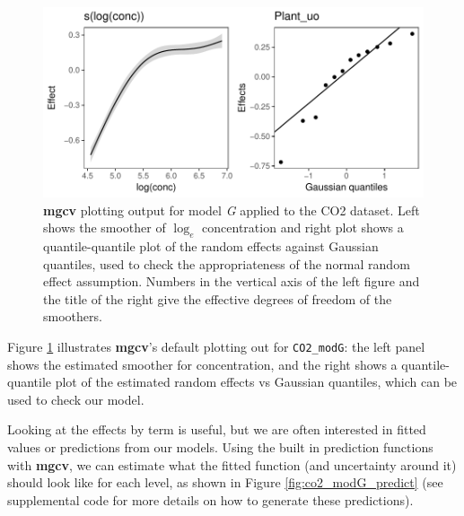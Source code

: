 \documentclass[12pt]{article}
\begin{document}
\begin{figure}
\centering
\includegraphics{../figures/co2_modG-1.pdf}
\caption{\label{fig:co2_modG}\textbf{mgcv} plotting output for model
\emph{G} applied to the CO2 dataset. Left shows the smoother of
\(\log_e\) concentration and right plot shows a quantile-quantile plot
of the random effects against Gaussian quantiles, used to check the
appropriateness of the normal random effect assumption. Numbers in the
vertical axis of the left figure and the title of the right give the
effective degrees of freedom of the smoothers.}
\end{figure}

Figure \ref{fig:co2_modG} illustrates \textbf{mgcv}'s default plotting
out for \texttt{CO2\_modG}: the left panel shows the estimated smoother
for concentration, and the right shows a quantile-quantile plot of the
estimated random effects vs Gaussian quantiles, which can be used to
check our model.

Looking at the effects by term is useful, but we are often interested in
fitted values or predictions from our models. Using the built in
prediction functions with \textbf{mgcv}, we can estimate what the fitted
function (and uncertainty around it) should look like for each level, as
shown in Figure \ref{fig:co2_modG_predict} (see supplemental code for
more details on how to generate these predictions).
\end{document}
